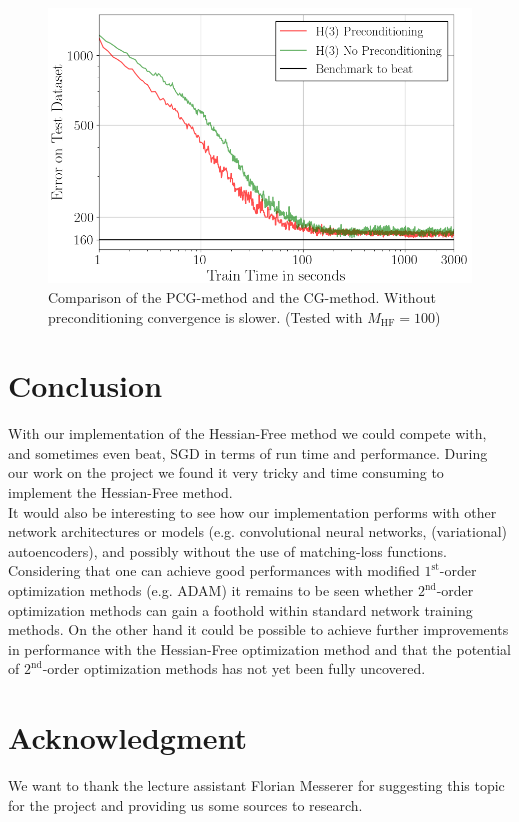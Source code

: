 \documentclass[conference]{IEEEtran}
\begin{document}
	
	\begin{figure}[htbp]
		\centerline{\includegraphics[scale=0.53]{Precond.png}}
		\caption{Comparison of the PCG-method and the CG-method. Without preconditioning convergence is slower. (Tested with $M_{\mathrm{HF}}=100$)}
		\label{fig4}
	\end{figure}
	
	
	
	\section{Conclusion}
	\noindent
	With our implementation of the Hessian-Free method we could compete with, and sometimes even beat, SGD in terms of run time and performance.
	During our work on the project we found it very tricky and time consuming to implement the Hessian-Free method.\\
	It would also be interesting to see how our implementation performs with other network architectures or models (e.g. convolutional neural networks, (variational) autoencoders), and possibly without the use of matching-loss functions.\\
	Considering that one can achieve good performances with modified $1^{\text{st}}$-order optimization methods (e.g. ADAM) it remains to be seen whether $2^{\text{nd}}$-order optimization methods can gain a foothold within standard network training methods. On the other hand it could be possible to achieve further improvements in performance with the Hessian-Free optimization method and that the potential of $2^{\text{nd}}$-order optimization methods has not yet been fully uncovered.
	
	\section*{Acknowledgment}
	\noindent
	We want to thank the lecture assistant Florian Messerer for suggesting this topic for the project and providing us some sources to research.
	
\end{document}
